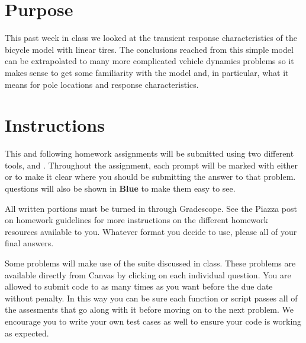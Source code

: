 
\hspace{0.5cm}

\section*{Purpose}

This past week in class we looked at the transient response characteristics of the bicycle model with linear
tires. The conclusions reached from this simple model can be extrapolated to many more complicated vehicle
dynamics problems so it makes sense to get some familiarity with the model and, in particular, what it means
for pole locations and response characteristics.


\section*{Instructions}

This and following homework assignments will be submitted using two different tools, \GSno{} and \GRno{}.
Throughout the assignment, each prompt will be marked with either \GS{} or \GR{} to make it clear
where you should be submitting the answer to that problem. \GRno{} questions will also be shown in
\textbf{\color{blue}Blue} to make them easy to see.

All written portions must be turned in through Gradescope. See the Piazza post on homework guidelines for more
instructions on the different homework resources available to you. Whatever format you decide to use, please  all of your final answers.

Some problems will make use of the \GRno{} suite discussed in class. These problems are available directly from Canvas
by clicking on each individual question.
You are allowed to submit code to \GRno{} as many times as you want before the due date without penalty. In this
way you can be sure each function or script passes all of the assesments that go along with it before moving on to the
next problem. We encourage you to write
your own test cases as well to ensure your code is working as expected.

\newpage

